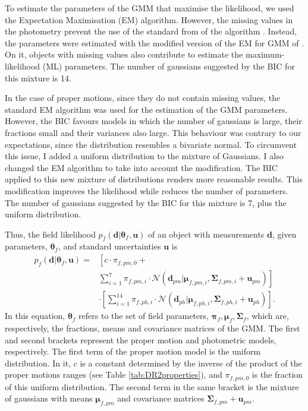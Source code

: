 To estimate the parameters of the GMM that maximise the likelihood, we used the Expectation Maximisation (EM) algorithm. However, the missing values in the photometry prevent the use of the standard from of the algorithm \cite[see for example Chapter 9 of][]{Bishop2006}.
Instead, the parameters were estimated with the modified version of the EM for GMM of \citet{McMichael1996}. On it, objects with missing values also contribute to estimate the maximum-likelihood (ML) parameters. The number of gaussians suggested by the BIC for this mixture is 14. 

In the case of proper motions, since they do not contain missing values, the standard EM algorithm was used for the estimation of the GMM parameters. However, the BIC favours models in which the number of gaussians is large, their fractions small and their variances also large. This behaviour was contrary to our expectations, since the distribution resembles a bivariate normal. To circumvent this issue, I added a uniform distribution to the mixture of Gaussians. I also changed the EM algorithm to take into account the modification. The BIC applied to this new mixture of distributions renders more reasonable results. This modification improves the likelihood while reduces the number of parameters. The number of gaussians suggested by the BIC for this mixture is 7, plus the uniform distribution. 

Thus, the field likelihood $p_f(\mathbf{d}|\boldsymbol{\theta}_f,\mathbf{u})$ of an object with measurements $\mathbf{d}$, given parameters, $\boldsymbol{\theta}_f$,  and standard uncertainties $\mathbf{u}$ is
\begin{align}
p_f(\mathbf{d}|\boldsymbol{\theta}_f,\mathbf{u})=&\left[ c\cdot\pi_{f,pm,0} + \nonumber \right. \\
&\left. \sum \limits_{i=1}^{7}\pi_{f,pm,i}\cdot \mathcal{N}(\mathbf{d}_{pm} | \boldsymbol{\mu}_{f,pm,i},\boldsymbol{\Sigma}_{f,pm,i}+\mathbf{u}_{pm})\right] \nonumber \\ 
&\cdot \left[ \sum \limits_{i=1}^{14}\pi_{f,ph,i}\cdot \mathcal{N}(\mathbf{d}_{ph} | \boldsymbol{\mu}_{f,ph,i},\boldsymbol{\Sigma}_{f,ph,i}+\mathbf{u}_{ph})\right].
\label{eq:field}
\end{align}
In this equation, $\boldsymbol{\theta}_f$ refers to the set of field parameters, $\boldsymbol{\pi}_f,\boldsymbol{\mu}_f,\boldsymbol{\Sigma}_f$, which are, respectively, the fractions, means and covariance matrices of the GMM. The first and second brackets represent the proper motion and photometric models, respectively. The first term of the proper motion model is the uniform distribution. In it, $c$ is a constant determined by the inverse of the product of the proper motions ranges (see Table \ref{tab:DR2properties}), and $\pi_{f,pm,0}$ is the fraction of this uniform distribution. The second term in the same bracket is the mixture of gaussians with means $\boldsymbol{\mu}_{f,pm}$ and covariance matrices $\boldsymbol{\Sigma}_{f,pm} +\mathbf{u}_{pm}$. 

